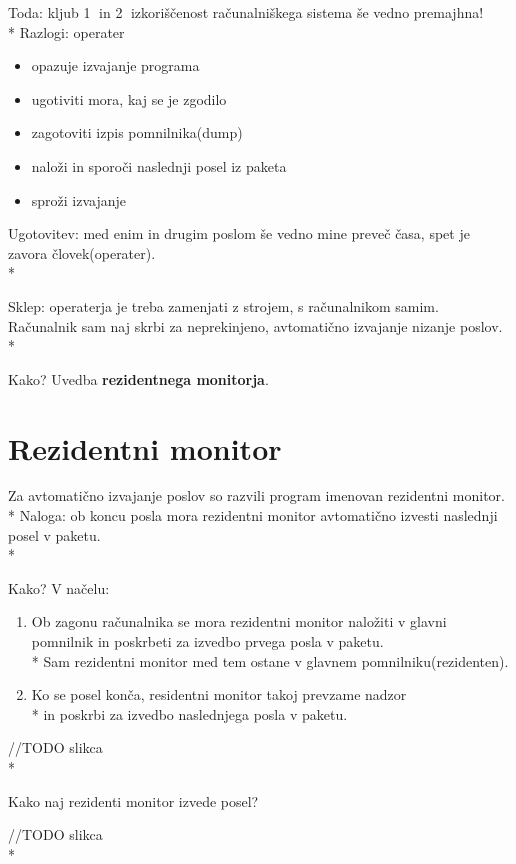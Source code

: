 \documentclass[
  slovene,
  a4paper
]{book}
\begin{document}
Toda: kljub \textcircled{1} in \textcircled{2} izkoriščenost računalniškega sistema še vedno premajhna!\\*
Razlogi: operater
\begin{itemize}
  \item opazuje izvajanje programa
  \item ugotiviti mora, kaj se je zgodilo
  \item zagotoviti izpis pomnilnika(dump)
  \item naloži in sporoči naslednji posel iz paketa
  \item sproži izvajanje
\end{itemize}

Ugotovitev: med enim in drugim poslom še vedno mine preveč časa, spet je zavora človek(operater).\\*

Sklep: operaterja je treba zamenjati z strojem, s računalnikom samim. Računalnik sam naj skrbi  za neprekinjeno, avtomatično izvajanje nizanje poslov.\\*

Kako? Uvedba \textbf{rezidentnega monitorja}.

\section{Rezidentni monitor}

Za avtomatično izvajanje poslov so razvili program imenovan rezidentni monitor.\\*
Naloga: ob koncu posla mora rezidentni monitor avtomatično izvesti naslednji posel v paketu.\\*

Kako? V načelu:
\begin{enumerate}
  \item Ob zagonu računalnika se mora rezidentni monitor naložiti v glavni pomnilnik in poskrbeti za izvedbo prvega posla v paketu.\\* Sam rezidentni monitor med tem ostane v glavnem pomnilniku(rezidenten).

  \item Ko se posel konča, residentni monitor takoj prevzame nadzor\\*
in poskrbi za izvedbo naslednjega posla v paketu.
\end{enumerate}
//TODO slikca\\*

Kako naj rezidenti monitor izvede posel?

//TODO slikca\\*
\end{document}
